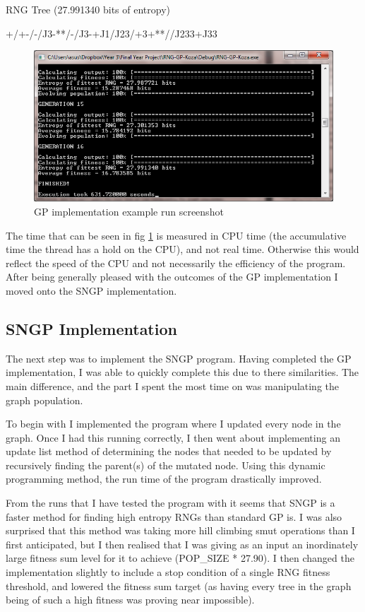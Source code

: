 \documentclass[a4paper,10.5pt]{article}
\begin{document}
\begin{center}
RNG Tree (27.991340 bits of entropy) 

+/+-/-/J3-**/-/J3-+J1/J23/+3+**//J233+J33%
\end{center}

\begin{figure}[!h]
\centering
\includegraphics[width=120mm]{gp-ss.png}
\caption{GP implementation example run screenshot}
\label{gp-ss}
\end{figure}

The time that can be seen in fig \ref{gp-ss} is measured in CPU time (the accumulative time the thread has a hold on the CPU), and not real time. Otherwise this would reflect the speed of the CPU and not necessarily the efficiency of the program. After being generally pleased with the outcomes of the GP implementation I moved onto the SNGP implementation.

\subsection{SNGP Implementation}

The next step was to implement the SNGP program. Having completed the GP implementation, I was able to quickly complete this due to there similarities. The main difference, and the part I spent the most time on was manipulating the graph population. 

To begin with I implemented the program where I updated every node in the graph. Once I had this running correctly, I then went about implementing an update list method of determining the nodes that needed to be updated by recursively finding the parent(s) of the mutated node. Using this dynamic programming method, the run time of the program drastically improved. 

From the runs that I have tested the program with it seems that SNGP is a faster method for finding high entropy RNGs than standard GP is. I was also surprised that this method was taking more hill climbing smut operations than I first anticipated, but I then realised that I was giving as an input an inordinately large fitness sum level for it to achieve (POP\_SIZE * 27.90). I then changed the implementation slightly to include a stop condition of a single RNG fitness threshold, and lowered the fitness sum target (as having every tree in the graph being of such a high fitness was proving near impossible).
\end{document}
